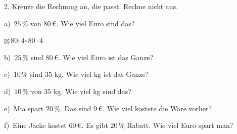 \documentclass[11pt]{article}
\newcommand{\grau}[1]{{\color{mbgrau}#1}}
\begin{document}
\begin{pfaufg}{}{2.}{}
Kreuze die Rechnung an, die passt. Rechne nicht aus.\par\medskip
\grau{a)\ $25\,\%$ von $80\,€$. Wie viel Euro sind das?\par\hspace*{1.2em}$\boxtimes$\,$80 : 4$\hspace{0.9em}$\square$\,$80 \cdot 4$\hspace{0.9em}}\par\medskip
b)\ $25\,\%$ sind $80\,€$. Wie viel Euro ist das Ganze?\par\hspace*{1.2em}\par\medskip
c)\ $10\,\%$ sind $35$ kg. Wie viel kg ist das Ganze?\par\hspace*{1.2em}\par\medskip
d)\ $10\,\%$ von $35$ kg. Wie viel kg sind das?\par\hspace*{1.2em}\par\medskip
e)\ Mia spart $20\,\%$. Das sind $9\,€$. Wie viel kostete die Ware vorher?\par\hspace*{1.2em}\par\medskip
f)\ Eine Jacke kostet $60\,€$. Es gibt $20\,\%$ Rabatt. Wie viel Euro spart man?\par\hspace*{1.2em}\par
{}
\end{pfaufg}
\end{document}
